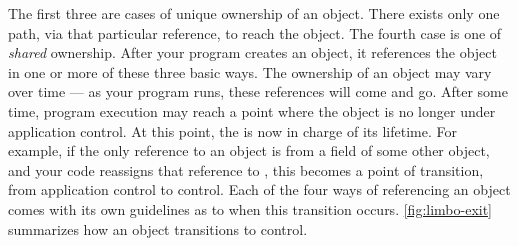 The first three are cases of unique ownership of an object. There exists
only one path, via that particular reference, to reach the object. The fourth
case is one of \emph{shared} ownership. After your program creates an object, it
references the object in one or more of these three basic ways. The ownership of
an object may vary over time --- as your program runs, these references will come
and go. After some time, program execution may reach a point where the object is
no longer under application control. At this point, the \jre is now in charge of
its lifetime. For example, if the only reference to an object is from a field of
some other object, and your code reassigns that reference to , this
becomes a point of transition, from application control to \jre control. Each of
the four ways of referencing an object comes with its own guidelines as to when
this transition occurs. \autoref{fig:limbo-exit} %
summarizes how an object transitions to \jre control.

